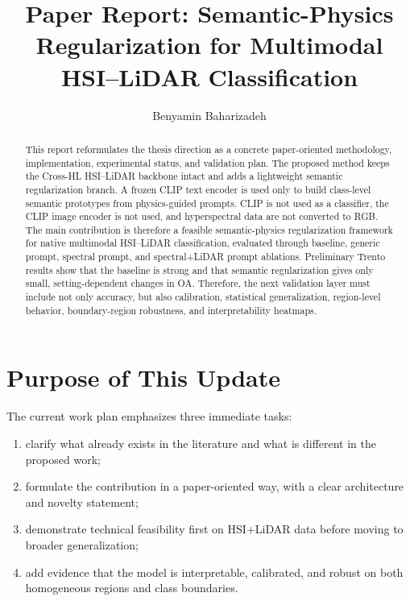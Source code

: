 \documentclass[10pt,journal,compsoc]{IEEEtran}
\begin{document}
\title{Paper Report: Semantic-Physics Regularization for Multimodal HSI--LiDAR Classification}

\author{Benyamin Baharizadeh}

\maketitle

\begin{abstract}
This report reformulates the thesis direction as a concrete paper-oriented methodology, implementation, experimental status, and validation plan. The proposed method keeps the Cross-HL HSI--LiDAR backbone intact and adds a lightweight semantic regularization branch. A frozen CLIP text encoder is used only to build class-level semantic prototypes from physics-guided prompts. CLIP is not used as a classifier, the CLIP image encoder is not used, and hyperspectral data are not converted to RGB. The main contribution is therefore a feasible semantic-physics regularization framework for native multimodal HSI--LiDAR classification, evaluated through baseline, generic prompt, spectral prompt, and spectral+LiDAR prompt ablations. Preliminary Trento results show that the baseline is strong and that semantic regularization gives only small, setting-dependent changes in OA. Therefore, the next validation layer must include not only accuracy, but also calibration, statistical generalization, region-level behavior, boundary-region robustness, and interpretability heatmaps.
\end{abstract}

\section{Purpose of This Update}

The current work plan emphasizes three immediate tasks:

\begin{enumerate}
    \item clarify what already exists in the literature and what is different in the proposed work;
    \item formulate the contribution in a paper-oriented way, with a clear architecture and novelty statement;
    \item demonstrate technical feasibility first on HSI+LiDAR data before moving to broader generalization;
    \item add evidence that the model is interpretable, calibrated, and robust on both homogeneous regions and class boundaries.
\end{enumerate}
\end{document}
